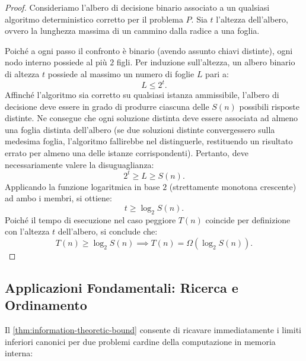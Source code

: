\begin{proof}
Consideriamo l'albero di decisione binario associato a un qualsiasi algoritmo deterministico corretto per il problema $P$. Sia $t$ l'altezza dell'albero, ovvero la lunghezza massima di un cammino dalla radice a una foglia.

Poiché a ogni passo il confronto è binario (avendo assunto chiavi distinte), ogni nodo interno possiede al più $2$ figli. Per induzione sull'altezza, un albero binario di altezza $t$ possiede al massimo un numero di foglie $L$ pari a:
\begin{equation}
  L \le 2^t.
\end{equation}
Affinché l'algoritmo sia corretto su qualsiasi istanza ammissibile, l'albero di decisione deve essere in grado di produrre ciascuna delle $S(n)$ possibili risposte distinte. Ne consegue che ogni soluzione distinta deve essere associata ad almeno una foglia distinta dell'albero (se due soluzioni distinte convergessero sulla medesima foglia, l'algoritmo fallirebbe nel distinguerle, restituendo un risultato errato per almeno una delle istanze corrispondenti). Pertanto, deve necessariamente valere la disuguaglianza:
\begin{equation}
  2^t \ge L \ge S(n).
\end{equation}
Applicando la funzione logaritmica in base $2$ (strettamente monotona crescente) ad ambo i membri, si ottiene:
\begin{equation}
  t \ge \log_2 S(n).
\end{equation}
Poiché il tempo di esecuzione nel caso peggiore $T(n)$ coincide per definizione con l'altezza $t$ dell'albero, si conclude che:
\begin{equation}
  T(n) \ge \log_2 S(n) \implies T(n) = \Omega(\log_2 S(n)).
\end{equation}
\end{proof}

\subsection{Applicazioni Fondamentali: Ricerca e Ordinamento}
\label{subsec:search-and-sort-applications}

Il \autoref{thm:information-theoretic-bound} consente di ricavare immediatamente i limiti inferiori canonici per due problemi cardine della computazione in memoria interna:

